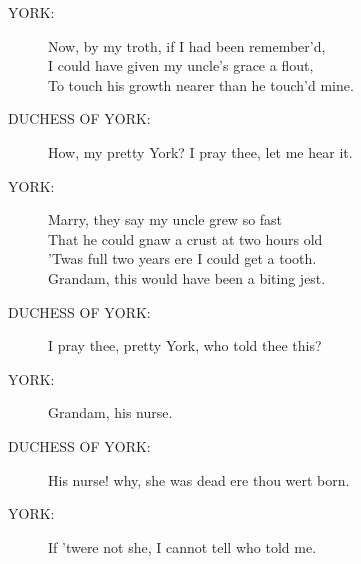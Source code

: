 \documentclass{article}
\begin{document}
\begin{description}
\item[YORK:] 
\hspace{1pt}Now, by my troth, if I had been remember'd,\\
\hspace{1pt}I could have given my uncle's grace a flout,\\
\hspace{1pt}To touch his growth nearer than he touch'd mine.\\
\end{description}
\begin{description}
\item[DUCHESS OF YORK:] 
\hspace{1pt}How, my pretty York? I pray thee, let me hear it.\\
\end{description}
\begin{description}
\item[YORK:] 
\hspace{1pt}Marry, they say my uncle grew so fast\\
\hspace{1pt}That he could gnaw a crust at two hours old\\
\hspace{1pt}'Twas full two years ere I could get a tooth.\\
\hspace{1pt}Grandam, this would have been a biting jest.\\
\end{description}
\begin{description}
\item[DUCHESS OF YORK:] 
\hspace{1pt}I pray thee, pretty York, who told thee this?\\
\end{description}
\begin{description}
\item[YORK:] 
\hspace{1pt}Grandam, his nurse.\\
\end{description}
\begin{description}
\item[DUCHESS OF YORK:] 
\hspace{1pt}His nurse! why, she was dead ere thou wert born.\\
\end{description}
\begin{description}
\item[YORK:] 
\hspace{1pt}If 'twere not she, I cannot tell who told me.\\
\end{description}
\end{document}
